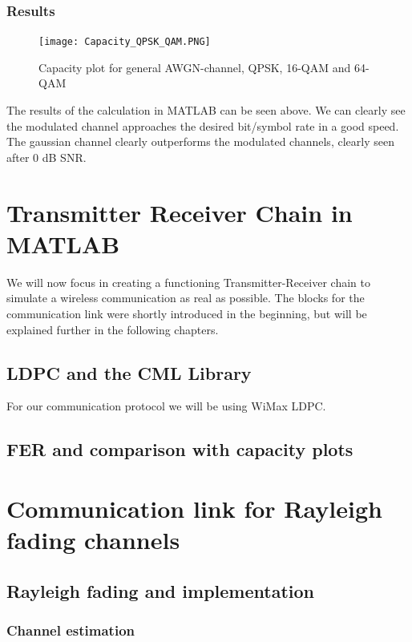 \documentclass[12pt,oneside, reqno]{report}
\begin{document}
\subsection{Results}
\begin{figure}[H]
	\centering
	\texttt{[image: Capacity\_QPSK\_QAM.PNG]}
	\caption{Capacity plot for general AWGN-channel, QPSK, 16-QAM and 64-QAM}
	\label{fig:Modulation}
\end{figure}
The results of the calculation in MATLAB can be seen above. We can clearly see the modulated channel approaches the desired bit/symbol rate in a good speed. The gaussian channel clearly outperforms the modulated channels, clearly seen after 0 dB SNR.



\chapter{Transmitter Receiver Chain in MATLAB}

We will now focus in creating a functioning Transmitter-Receiver chain to simulate a wireless communication as real as possible. The blocks for the communication link were shortly introduced in the beginning, but will be explained further in the following chapters.


\section{LDPC and the CML Library}
For our communication protocol we will be using WiMax LDPC. 



\section{FER and comparison with capacity plots}


\chapter{Communication link for Rayleigh fading channels}

\section{Rayleigh fading and implementation}

\subsection{Channel estimation}
\end{document}
